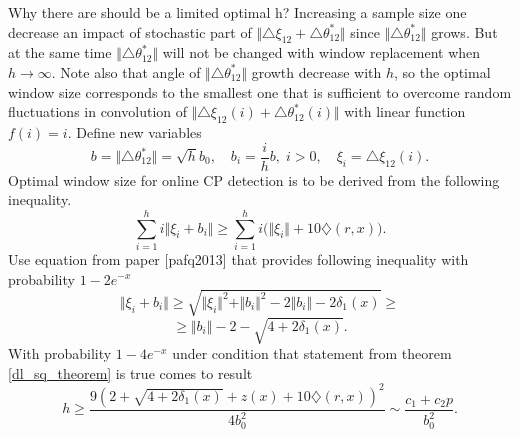 Why there are should be a limited optimal h? Increasing a sample size one decrease an impact of stochastic part of $\Vert  \triangle \xi_{12} + \triangle \theta^*_{12} \Vert$ since  $\Vert \triangle \theta^*_{12} \Vert$ grows. But at the same time $\Vert \triangle \theta^*_{12} \Vert$ will not be changed with window replacement when $h \to \infty$. Note also that angle of $\Vert \triangle \theta^*_{12} \Vert$ growth decrease with $h$, so the optimal window size corresponds to the smallest one that is sufficient to overcome random fluctuations in convolution of $\Vert  \triangle \xi_{12}(i) + \triangle \theta^*_{12}(i) \Vert$ with linear function $f(i) = i$.   
Define new variables
\[
b = \Vert \triangle \theta^*_{12} \Vert = \sqrt{h} b_0,
\quad 
b_i = \frac{i}{h} b, \; i > 0,
\quad
\xi_i = \triangle \xi_{12}(i).
\]
Optimal window size for online CP detection is to be derived from the following inequality.
\[
\sum_{i = 1}^{h} i \Vert \xi_i + b_i \Vert \geq \sum_{i = 1}^{h} i \bigg(\Vert \xi_i \Vert + 10 \diamondsuit(r,x) \bigg). 
\]
Use equation from paper [pafq2013] that provides following inequality with probability $1 - 2 e^{-x}$ 
\[
\Vert \xi_i + b_i \Vert \geq \sqrt{ \Vert \xi_i \Vert^2 + \Vert b_i \Vert^2  - 2 \Vert b_i \Vert - 2 \delta_1(x) } 
\geq 
\]
\[
\geq \Vert b_i \Vert - 2  - \sqrt{4 + 2 \delta_1(x)}.
\]
 With probability $1 - 4 e^{-x}$ under condition that statement from theorem \ref{dl_sq_theorem} is true comes to result 
\[
h \geq \frac{9 (2 + \sqrt{4 + 2 \delta_1(x)} + z(x) +  10 \diamondsuit(r,x) )^2 }{4 b_0^2} \sim \frac{c_1 + c_2 p}{b_0^2}. 
\]